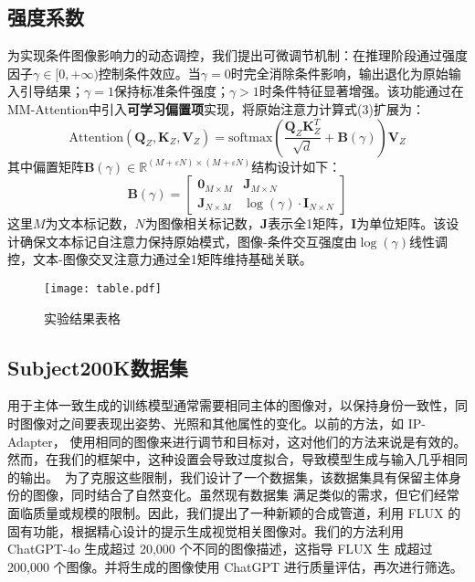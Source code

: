 \subsection{强度系数}
为实现条件图像影响力的动态调控，我们提出可微调节机制：在推理阶段通过强度因子$\gamma \in [0, +\infty)$控制条件效应。当$\gamma=0$时完全消除条件影响，输出退化为原始输入引导结果；$\gamma=1$保持标准条件强度；$\gamma>1$时条件特征显著增强。该功能通过在MM-Attention中引入\textbf{可学习偏置项}实现，将原始注意力计算式(3)扩展为：
\begin{equation}
    \text{Attention}(\mathbf{Q}_Z, \mathbf{K}_Z, \mathbf{V}_Z) = \text{softmax}\left(\frac{\mathbf{Q}_Z\mathbf{K}_Z^T}{\sqrt{d}} + \mathbf{B}(\gamma)\right)\mathbf{V}_Z
\end{equation}
其中偏置矩阵$\mathbf{B}(\gamma) \in \mathbb{R}^{(M+\varepsilon N)\times(M+\varepsilon N)}$结构设计如下：
\begin{equation}
    \mathbf{B}(\gamma) = \begin{bmatrix}
        \mathbf{0}_{M \times M} & \mathbf{J}_{M \times N} \\
        \mathbf{J}_{N \times M} & \log(\gamma) \cdot \mathbf{I}_{N \times N}
    \end{bmatrix}
\end{equation}
这里$M$为文本标记数，$N$为图像相关标记数，$\mathbf{J}$表示全1矩阵，$\mathbf{I}$为单位矩阵。该设计确保文本标记自注意力保持原始模式，图像-条件交互强度由$\log(\gamma)$线性调控，文本-图像交叉注意力通过全1矩阵维持基础关联。

\begin{figure}[htbp]
    \centering
    \texttt{[image: table.pdf]}
    \caption{实验结果表格}
    \label{fig:table}
\end{figure}
\subsection{Subject200K数据集}
用于主体一致生成的训练模型通常需要相同主体的图像对，以保持身份一致性，同时图像对之间要表现出姿势、光照和其他属性的变化。以前的方法，如 IP-Adapter\cite{ye2023ip}， 使用相同的图像来进行调节和目标对，这对他们的方法来说是有效的。然而，在我们的框架中，这种设置会导致过度拟合，导致模型生成与输入几乎相同的输出。\
为了克服这些限制，我们设计了一个数据集，该数据集具有保留主体身份的图像，同时结合了自然变化。虽然现有数据集\cite{kumari2023multi,li2023blip,li2024photomaker,ruiz2023dreambooth} 满足类似的需求，但它们经常面临质量或规模的限制。因此，我们提出了一种新颖的合成管道，利用 FLUX 的固有功能，根据精心设计的提示生成视觉相关图像对。我们的方法利用 ChatGPT-4o 生成超过 20,000 个不同的图像描述，这指导 FLUX 生 成超过200,000 个图像。并将生成的图像使用 ChatGPT 进行质量评估，再次进行筛选。

